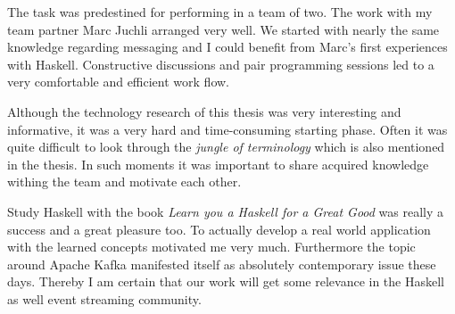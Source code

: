 The task was predestined for performing in a team of two. The work with my team
partner Marc Juchli arranged very well. We started with nearly the same
knowledge regarding messaging and I could benefit from Marc's first experiences
with Haskell. Constructive discussions and pair programming sessions led to a
very comfortable and efficient work flow.

Although the technology research of this thesis was very interesting and
informative, it was a very hard and time-consuming starting phase. Often it was
quite difficult to look through the \textit{jungle of terminology} which is also
mentioned in the thesis. In such moments it was important to share acquired
knowledge withing the team and motivate each other.

Study Haskell with the book \textit{Learn you a Haskell for a Great Good} was
really a success and a great pleasure too. To actually develop a real world
application with the learned concepts motivated me very much. Furthermore
the topic around Apache Kafka manifested itself as absolutely contemporary issue
these days. Thereby I am certain that our work will get some relevance in
the Haskell as well event streaming community.



